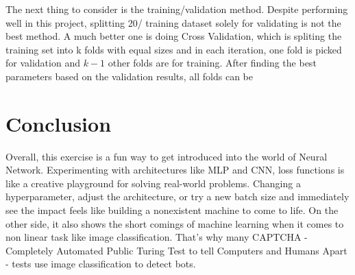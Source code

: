\documentclass{report}
\begin{document}
The next thing to consider is the training/validation method. Despite performing well in this project, splitting 20/%
training dataset solely for validating is not the best method. A much better one is doing Cross Validation, 
which is spliting the training set into k folds with equal sizes and in each iteration, one fold is picked for
validation and $k-1$ other folds are for training. After finding the best parameters based on the validation results,
all folds can be 

\begingroup
\let\clearpage\relax

\chapter*{Conclusion}
Overall, this exercise is a fun way to get introduced into the world of Neural Network. Experimenting with 
architectures like MLP and CNN, loss functions is like a creative playground for solving real-world problems.
Changing a hyperparameter, adjust the architecture, or try a new batch size and immediately see the impact 
feels like building a nonexistent machine to come to life. On the other side, it also shows the short comings
of machine learning when it comes to non linear task like image classification. That's why many CAPTCHA - 
Completely Automated Public Turing Test to tell Computers and Humans Apart - tests use image classification
to detect bots.

\endgroup


\end{document}
